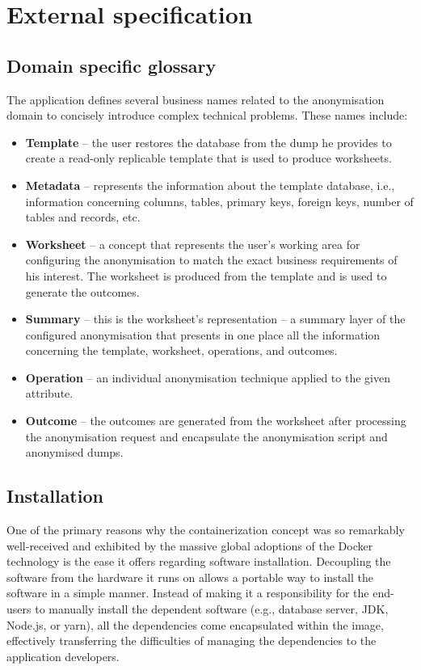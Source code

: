 \documentclass[a4paper,twoside,12pt]{book}
\begin{document}
\chapter{External specification}
\label{ch:external-specification}

\section{Domain specific glossary}

The application defines several business names related to the anonymisation domain to concisely introduce complex technical problems. These names include:
\begin{itemize}
\item \textbf{Template} – the user restores the database from the dump he provides to create a read-only replicable template that is used to produce worksheets.
\item \textbf{Metadata} – represents the information about the template database, i.e., information concerning columns, tables, primary keys, foreign keys, number of tables and records, etc.
\item \textbf{Worksheet} – a concept that represents the user's working area for configuring the anonymisation to match the exact business requirements of his interest. The worksheet is produced from the template and is used to generate the outcomes.
\item \textbf{Summary} – this is the worksheet's representation – a summary layer of the configured anonymisation that presents in one place all the information concerning the template, worksheet, operations, and outcomes.
\item \textbf{Operation} – an individual anonymisation technique applied to the given attribute.
\item \textbf{Outcome} – the outcomes are generated from the worksheet after processing the anonymisation request and encapsulate the anonymisation script and anonymised dumps.
\end{itemize}

\section{Installation}

One of the primary reasons why the containerization concept was so remarkably well-received \cite{bib:stackoverflow2021} and exhibited by the massive global adoptions of the Docker technology is the ease it offers regarding software installation. Decoupling the software from the hardware it runs on allows a portable way to install the software in a simple manner. Instead of making it a responsibility for the end-users to manually install the dependent software (e.g., database server, JDK, Node.js, or yarn), all the dependencies come encapsulated within the image, effectively transferring the difficulties of managing the dependencies to the application developers.
\end{document}
